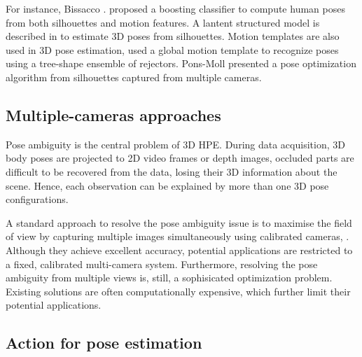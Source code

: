 For instance, Bissacco \etal. \cite{Bissacco2007} proposed a boosting classifier to compute human poses from both silhouettes and motion features.  
A lantent structured model is described in \cite{Ionescu2011} to estimate 3D poses from silhouettes. 
Motion templates are also used in 3D pose estimation, \cite{Rogez2012} used a global motion template to recognize poses using a tree-shape ensemble of rejectors. 
Pons-Moll \etal \cite{Pons-Moll2011} presented a pose optimization algorithm from silhouettes captured from multiple cameras. 


\subsection{Multiple-cameras approaches} 

Pose ambiguity is the central problem of 3D HPE. 
During data acquisition, 3D body poses are projected to 2D video frames or depth images, occluded parts are difficult to be recovered from the data, losing their 3D information about the scene. Hence, each observation can be explained by more than one 3D pose configurations. 

A standard approach to resolve the pose ambiguity issue is to maximise the field of view by capturing multiple images simultaneously using calibrated cameras, \eg \cite{Pons-Moll2011, Sigal2012, Yao2012}.   
Although they achieve excellent accuracy, potential applications are restricted to a fixed, calibrated multi-camera system. 
Furthermore, resolving the pose ambiguity from multiple views is, still, a sophisicated optimization problem. 
Existing solutions are often computationally expensive, which further limit their potential applications.   

\subsection{Action for pose estimation}

